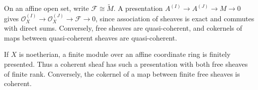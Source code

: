 On an affine open set, write $\mathcal F\cong\widetilde M$. A presentation $A^{(I)}\to A^{(J)}\to M\to0$ gives $\mathcal O_X^{(I)}\to\mathcal O_X^{(J)}\to\mathcal F\to0$, since association of sheaves is exact and commutes with direct sums. Conversely, free sheaves are quasi-coherent, and cokernels of maps between quasi-coherent sheaves are quasi-coherent.

If $X$ is noetherian, a finite module over an affine coordinate ring is finitely presented. Thus a coherent sheaf has such a presentation with both free sheaves of finite rank. Conversely, the cokernel of a map between finite free sheaves is coherent.
